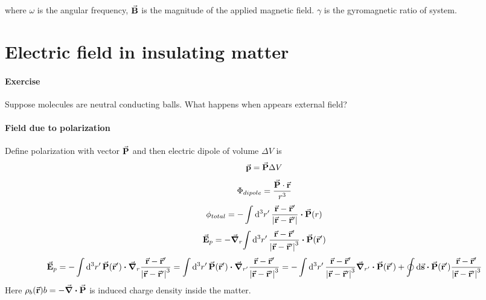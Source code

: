where $\omega $ is the angular frequency, $\va{B}$ is the magnitude of the applied magnetic field. $\gamma$ is the gyromagnetic ratio of system.

\section{Electric field in insulating matter}
\paragraph{Exercise}
Suppose molecules are neutral conducting balls. What happens when appears external field? 
\paragraph{Field due to polarization}
Define polarization with vector $\va{P}$ and then electric dipole of volume $\Delta V$ is
$$\va{p} = \va{P} \Delta V $$ %
$$\Phi_{dipole} = \frac{\va{P}\cdot \va{r}}{r^3}$$
$$\phi_{total} =- \int \dd[3]{r'} \frac{\va{r} - \va{r}'}{\abs{\va{r} -\va{r}'}}\vdot \va{P}(r) $$
$$ \va{E}_p = -\grad_r{\int \dd[3]{r'} \frac{\va{r}-\va{r}'}{\abs{\va{r}-\va{r}'}^3} \vdot \va{P}(\va{r}')}$$
$$\va{E}_p = -\int \dd[3]{r'}  \va{P}(\va{r}') \vdot \grad_r\frac{\va{r}-\va{r}'}{\abs{\va{r}-\va{r}'}^3}  = \int \dd[3]{r'}  \va{P}(\va{r}') \vdot \grad_{r'}\frac{\va{r}-\va{r}'}{\abs{\va{r}-\va{r}'}^3} = -\int \dd[3]{r'}  \frac{\va{r}-\va{r}'}{\abs{\va{r}-\va{r}'}^3}  \grad_{r'} \vdot \va{P}(\va{r}') + \oint \dd{\va{s}}  \vdot \va{P} (\va{r}') \frac{\va{r}-\va{r}'}{\abs{\va{r}-\va{r}'}^3}  $$
Here $\rho_b(\va{r})b= -\div{\va{P}}$ is induced charge density inside the matter.